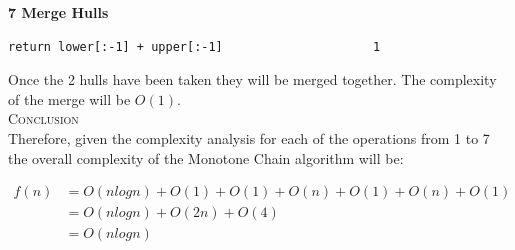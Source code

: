 \documentclass[pdftex,12pt,a4paper]{article}
\newcommand{\nspace}{\\[0.25cm]}
\newcommand{\lspace}{\\[0.50cm]}
\begin{document}
{\bf \large 7 Merge Hulls}
\begin{verbatim}
return lower[:-1] + upper[:-1]                     1
\end{verbatim}

Once the 2 hulls have been taken they will be merged together. The complexity of the merge will be $O(1)$.\lspace




\newpage
\textsc{\Large Conclusion} \hfill \nspace

Therefore, given the complexity analysis for each of the operations from 1 to 7 the overall complexity of the Monotone Chain algorithm will be:

\begin{equation}
\begin{split}
f(n) &= O(nlogn) + O(1) + O(1) + O(n) + O(1) + O(n) + O(1)\\
     &= O(nlogn) + O(2n) + O(4)\\
     &= O(nlogn)
\end{split}
\end{equation}












\end{document}
